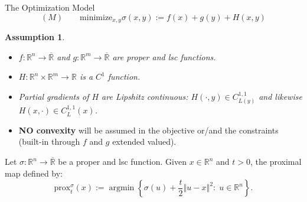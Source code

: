 \documentclass[9pt]{beamer}
\newtheorem{assumption}{Assumption}
\newcommand{\prox}{\mathrm{prox}} %
\newcommand{\rr}{\mathbb{R}} %
\newcommand{\norm}[1]{\left\Vert {#1} \right\Vert} %
\newcommand{\argmin}{\operatorname{argmin}}
\begin{document}
    \begin{frame}{The Optimization Model}
        \begin{equation*}
            (M) \qquad \mbox{minimize}_{x , y} \sigma\left(x , y\right) := f\left(x\right) + g\left(y\right) + H\left(x , y\right)
        \end{equation*}
        \pause
        \begin{assumption} \label{AssumptionsA}
            \begin{itemize}
                \item[$\rm{(i)}$] $f : \rr^{n} \rightarrow \overline{\rr}$ and $g : \rr^{m} \rightarrow \overline{\rr}$ are proper and lsc functions.
                \item[$\rm{(ii)}$] $H : \rr^{n} \times \rr^{m} \rightarrow \rr$ is a $C^{1}$ function.
                \item[$\rm{(iii)}$] Partial gradients of $H$ are Lipshitz continuous: $H\left(\cdot , y\right) \in C^{1,1}_{L(y)}$ and likewise $H\left(x , \cdot\right) \in C^{1,1}_L(x)$.
            \end{itemize}
        \end{assumption}
        \pause
        \begin{itemize}[<+->]
            \item {\bf NO convexity} will be assumed in the objective or/and the constraints (built-in through $f$ and $g$ extended valued).
        \end{itemize}
        \pause
        Let $\sigma : \rr^{n} \rightarrow \overline{\rr}$ be a proper and lsc function. Given 
		$x \in \rr^{n}$ and $t > 0$, the proximal map defined by:
        \begin{equation*}
            \prox_{t}^{\sigma}\left(x\right) := \argmin \left\{ \sigma\left(u\right) + 
            \frac{t}{2}\norm{u - x}^{2} : \; u \in \rr^{n} \right\}.
        \end{equation*}
    \end{frame}
\end{document}
